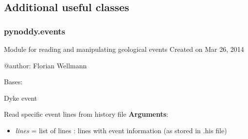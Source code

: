 \documentclass[a4paper,10pt,english]{sphinxmanual}
\begin{document}
\begin{fulllineitems}
\begin{fulllineitems}
\begin{description}
\begin{itemize}
\begin{description}
\end{description}

\end{itemize}

\end{description}

\end{fulllineitems}


\end{fulllineitems}



\subsection{Additional useful classes}
\label{pynoddy:additional-useful-classes}

\subsubsection{pynoddy.events}
\label{pynoddy:pynoddy-events}\label{pynoddy:module-pynoddy.events}
Module for reading and manipulating geological events
Created on Mar 26, 2014

@author: Florian Wellmann

\begin{fulllineitems}
\label{pynoddy:pynoddy.events.Dyke}
Bases: {\hyperref[pynoddy:pynoddy.events.Event]{\emph{}}}

Dyke event

\begin{fulllineitems}
\label{pynoddy:pynoddy.events.Dyke.parse_event_lines}
Read specific event lines from history file
\textbf{Arguments}:
\begin{itemize}
\item {} 
\emph{lines} = list of lines : lines with event information (as stored in .his file)

\end{itemize}

\end{fulllineitems}


\end{fulllineitems}

\end{document}
